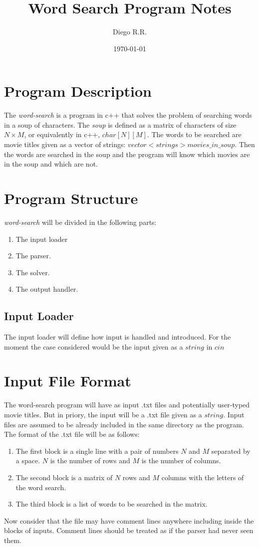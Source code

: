\documentclass{extarticle}
\author{Diego R.R.}
\title{Word Search Program Notes}
\date{\today}
\newcommand{\code}[1]{$#1$} %
\newcommand{\prgmtitle}{\textit{word-search}\xspace} %
\begin{document}
\maketitle

\section{Program Description}
The \prgmtitle is a program in c++ that solves the problem of searching
words in a soup of characters. The \textit{soup} is defined as a matrix
of characters of size $N \times M$, or equivalently in c++, \code{char[N][M]}. The words
to be searched are movie titles given as a vector of strings: \code{vector<strings> movies\_in\_soup}. 
Then the words are searched in the soup and the program will know which movies are in the soup and which are not.

\section{Program Structure}
\prgmtitle will be divided in the following parts:
    \begin{enumerate}
        \item The input loader
        \item The parser.
        \item The solver.
        \item The output handler.
    \end{enumerate}

\subsection{Input Loader}
The input loader will define how input is handled and introduced.
For the moment the case considered would be the input given as a \code{string}
in \code{cin}

\section{Input File Format}
The word-search program will have as input .txt files and potentially user-typed movie titles.
But in priory, the input will be a .txt file given as a \code{string}. Input files are assumed
to be already included in the same directory as the program. The format of the .txt file
will be as follows:
    \begin{enumerate}
        \item The first block is a single line with a pair of numbers $N$ and $M$ separated by a space. 
        $N$ is the number of rows and $M$ is the number of columns.
        \item The second block is a matrix of $N$ rows and $M$ columns with the letters of the word search.
        \item The third block is a list of words to be searched in the matrix.
    \end{enumerate}
Now consider that the file may have comment lines anywhere including
inside the blocks of inputs. Comment lines should be treated as if the 
parser had never seen them.
\end{document}
